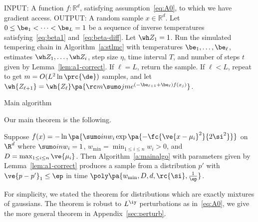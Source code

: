 \begin{algorithm}
\begin{algorithmic}
\STATE INPUT: A function $ f: \mathbb{R}^d$, satisfying assumption~\eqref{eq:A0}, to which we have gradient access.  
\STATE OUTPUT: A random sample $x \in \mathbb{R}^d$. 
\STATE Let $0\le \be_1<\cdots < \be_L=1$ be a sequence of inverse temperatures satisfying~\eqref{eq:beta1} and~\eqref{eq:beta-diff}. %
\STATE Let $\wh Z_1=1$.
 \STATE Run the simulated tempering chain in Algorithm~\ref{a:stlmc} with temperatures 
$\be_1,\ldots, \be_{\ell}$, estimates $\wh Z_1,\ldots, \wh Z_{i}$, step size $\eta$, time interval $T$, and 
number of steps $t$ given by Lemma~\ref{lem:a1-correct}. 
 \STATE If $\ell=L$, return the sample.
 \STATE If $\ell<L$, repeat to get $m=O(L^2\ln \prc{\de})$ samples, and let $\wh{Z_{\ell+1}} = \wh{Z_\ell} \pa{
 \rc m \sumo jm e^{(-\be_{\ell+1}+\be_\ell)f(x_j)}}$.
\ENDFOR
\end{algorithmic}
 \caption{Main algorithm}
\label{a:mainalgo}
\end{algorithm}

Our main theorem is the following. 
\begin{thm}\label{thm:main}
Suppose $f(x) = -\ln \pa{\sumo in w_i \exp\pa{-\fc{\ve{x-\mu_i}^2}{2\si^2}}}$ on $\R^d$ where $\sumo in w_i=1$, $w_{\min}=\min_{1\le i\le n}w_i>0$, and $D=\max_{1\le i\le n}\ve{\mu_i}$. Then 
Algorithm~\ref{a:mainalgo} with parameters given by Lemma~\ref{lem:a1-correct} produces a sample from a distribution $p'$ with $\ve{p-p'}_1\le \ep$ in time $\poly\pa{w_{\min}, D, d, \rc{\si}, \frac{1}{\ep}}$.
\end{thm}
For simplicity, we stated the theorem for distributions which are exactly mixtures of gaussians. The theorem is robust to $L^\iy$ perturbations as in~\eqref{eq:A0}, we give the more general theorem in Appendix~\ref{sec:perturb}.

